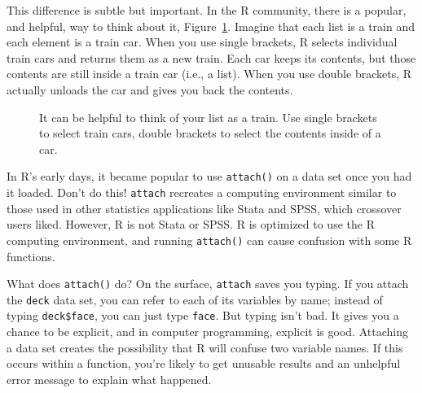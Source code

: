 \documentclass[
  letterpaper,
  DIV=11,
  numbers=noendperiod]{scrbook}
\makeatletter
\newenvironment{Shaded}{\begin{snugshade}}{\end{snugshade}}
\newcommand{\DocumentationTok}[1]{\textcolor[rgb]{0.37,0.37,0.37}{\textit{#1}}}
\newcommand{\NormalTok}[1]{\textcolor[rgb]{0.00,0.23,0.31}{#1}}
\newcommand{\StringTok}[1]{\textcolor[rgb]{0.13,0.47,0.30}{#1}}
\newcommand*\pandocbounded[1]{%
  \sbox\pandoc@box{#1}%
  \Gscale@div\@tempa{\textheight}{\dimexpr\ht\pandoc@box+\dp\pandoc@box\relax}%
  \Gscale@div\@tempb{\linewidth}{\wd\pandoc@box}%
  \ifdim\@tempb\p@<\@tempa\p@\let\@tempa\@tempb\fi%
  \ifdim\@tempa\p@<\p@\scalebox{\@tempa}{\usebox\pandoc@box}%
  \else\usebox{\pandoc@box}%
  \fi%
}
\makeatother
\begin{document}
\begin{Shaded}
\end{Shaded}

This difference is subtle but important. In the R community, there is a
popular, and helpful, way to think about it, Figure~\ref{fig-trains}.
Imagine that each list is a train and each element is a train car. When
you use single brackets, R selects individual train cars and returns
them as a new train. Each car keeps its contents, but those contents are
still inside a train car (i.e., a list). When you use double brackets, R
actually unloads the car and gives you back the contents.

\begin{figure}

\centering{

\pandocbounded{\texttt{[image: images/hopr\_0403.png]}}

}

\caption{\label{fig-trains}It can be helpful to think of your list as a
train. Use single brackets to select train cars, double brackets to
select the contents inside of a car.}

\end{figure}%

\begin{tcolorbox}[enhanced jigsaw, breakable, colback=white, colbacktitle=quarto-callout-important-color!10!white, arc=.35mm, bottomrule=.15mm, coltitle=black, left=2mm, rightrule=.15mm, colframe=quarto-callout-important-color-frame, leftrule=.75mm, opacitybacktitle=0.6, bottomtitle=1mm, toptitle=1mm, titlerule=0mm, opacityback=0, title=\textcolor{quarto-callout-important-color}{\faExclamation}\hspace{0.5em}{Never attach}, toprule=.15mm]

In R's early days, it became popular to use \texttt{attach()} on a data
set once you had it loaded. Don't do this! \texttt{attach} recreates a
computing environment similar to those used in other statistics
applications like Stata and SPSS, which crossover users liked. However,
R is not Stata or SPSS. R is optimized to use the R computing
environment, and running \texttt{attach()} can cause confusion with some
R functions.

What does \texttt{attach()} do? On the surface, \texttt{attach} saves
you typing. If you attach the \texttt{deck} data set, you can refer to
each of its variables by name; instead of typing \texttt{deck\$face},
you can just type \texttt{face}. But typing isn't bad. It gives you a
chance to be explicit, and in computer programming, explicit is good.
Attaching a data set creates the possibility that R will confuse two
variable names. If this occurs within a function, you're likely to get
unusable results and an unhelpful error message to explain what
happened.

\end{tcolorbox}
\end{document}
